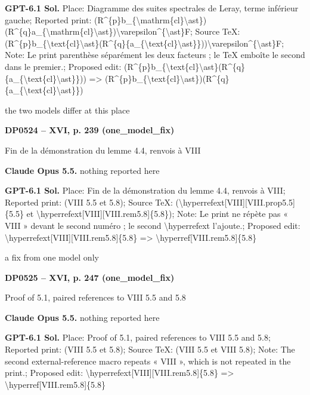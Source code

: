 \textbf{GPT-6.1 Sol.} Place: Diagramme des suites spectrales de Leray, terme inférieur gauche; Reported print: (R\textasciicircum{}\{p\}b\_\{\textbackslash{}mathrm\{cl\}\textbackslash{}ast\})(R\textasciicircum{}\{q\}a\_\{\textbackslash{}mathrm\{cl\}\textbackslash{}ast\})\textbackslash{}varepsilon\textasciicircum{}\{\textbackslash{}ast\}F; Source TeX: (R\textasciicircum{}\{p\}b\_\{\textbackslash{}text\{cl\}\textbackslash{}ast\}(R\textasciicircum{}\{q\}\{a\_\{\textbackslash{}text\{cl\}\textbackslash{}ast\}\}))\textbackslash{}varepsilon\textasciicircum{}\{\textbackslash{}ast\}F; Note: Le print parenthèse séparément les deux facteurs ; le TeX emboîte le second dans le premier.; Proposed edit: (R\textasciicircum{}\{p\}b\_\{\textbackslash{}text\{cl\}\textbackslash{}ast\}(R\textasciicircum{}\{q\}\{a\_\{\textbackslash{}text\{cl\}\textbackslash{}ast\}\})) =\allowbreak > (R\textasciicircum{}\{p\}b\_\{\textbackslash{}text\{cl\}\textbackslash{}ast\})(R\textasciicircum{}\{q\}\{a\_\{\textbackslash{}text\{cl\}\textbackslash{}ast\}\})\par
the two models differ at this place\par
\par\noindent\hypertarget{DP0524}{}\textbf{DP0524 -- XVI, p. 239 (one\_model\_fix)}\par
Fin de la démonstration du lemme 4.4, renvois à VIII\par
\textbf{Claude Opus 5.5.} nothing reported here\par
\textbf{GPT-6.1 Sol.} Place: Fin de la démonstration du lemme 4.4, renvois à VIII; Reported print: (VIII 5.5 et 5.8); Source TeX: (\textbackslash{}hyperrefext[VIII][VIII.prop5.5]\{5.5\} et \textbackslash{}hyperrefext[VIII][VIII.rem5.8]\{5.8\}); Note: Le print ne répète pas « VIII » devant le second numéro ; le second \textbackslash{}hyperrefext l'ajoute.; Proposed edit: \textbackslash{}hyperrefext[VIII][VIII.rem5.8]\{5.8\} =\allowbreak > \textbackslash{}hyperref[VIII.rem5.8]\{5.8\}\par
a fix from one model only\par
\par\noindent\hypertarget{DP0525}{}\textbf{DP0525 -- XVI, p. 247 (one\_model\_fix)}\par
Proof of 5.1, paired references to VIII 5.5 and 5.8\par
\textbf{Claude Opus 5.5.} nothing reported here\par
\textbf{GPT-6.1 Sol.} Place: Proof of 5.1, paired references to VIII 5.5 and 5.8; Reported print: (VIII 5.5 et 5.8); Source TeX: (VIII 5.5 et VIII 5.8); Note: The second external-reference macro repeats « VIII », which is not repeated in the print.; Proposed edit: \textbackslash{}hyperrefext[VIII][VIII.rem5.8]\{5.8\} =\allowbreak > \textbackslash{}hyperref[VIII.rem5.8]\{5.8\}\par
